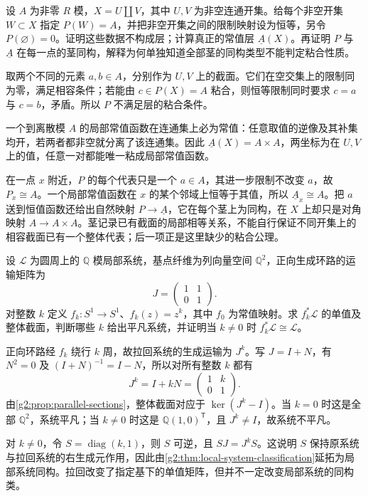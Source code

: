 \BookExercises

\begin{exercise}\label{g2:ex:constant-presheaf-gluing}
	设 \(A\) 为非零 \(R\) 模，\(X=U\amalg V\)，其中 \(U,V\) 为非空连通开集。给每个非空开集 \(W\subset X\) 指定 \(P(W)=A\)，并把非空开集之间的限制映射设为恒等，另令 \(P(\varnothing)=0\)。证明这些数据不构成层；计算真正的常值层 \(\underline A(X)\)。再证明 \(P\) 与 \(\underline A\) 在每一点的茎同构，解释为何单独知道全部茎的同构类型不能判定粘合性质。
\end{exercise}
\begin{solution}
	取两个不同的元素 \(a,b\in A\)，分别作为 \(U,V\) 上的截面。它们在空交集上的限制同为零，满足相容条件；若能由 \(c\in P(X)=A\) 粘合，则恒等限制同时要求 \(c=a\) 与 \(c=b\)，矛盾。所以 \(P\) 不满足层的粘合条件。

	一个到离散模 \(A\) 的局部常值函数在连通集上必为常值：任意取值的逆像及其补集均开，若两者都非空就分离了该连通集。因此 \(\underline A(X)=A\times A\)，两坐标为在 \(U,V\) 上的值，任意一对都能唯一粘成局部常值函数。

	在一点 \(x\) 附近，\(P\) 的每个代表只是一个 \(a\in A\)，其进一步限制不改变 \(a\)，故 \(P_x\cong A\)。一个局部常值函数在 \(x\) 的某个邻域上恒等于其值，所以 \(\underline A_x\cong A\)。把 \(a\) 送到恒值函数还给出自然映射 \(P\to\underline A\)，它在每个茎上为同构，在 \(X\) 上却只是对角映射 \(A\to A\times A\)。茎记录已有截面的局部相等关系，不能自行保证不同开集上的相容截面已有一个整体代表；后一项正是这里缺少的粘合公理。
\end{solution}

\begin{exercise}\label{g2:ex:unipotent-circle-system}
	设 \(\mathcal L\) 为圆周上的 \(\mathbb Q\) 模局部系统，基点纤维为列向量空间 \(\mathbb Q^2\)，正向生成环路的运输矩阵为
	\[
		J=\begin{pmatrix}1&1\\0&1\end{pmatrix}.
	\]
	对整数 \(k\) 定义 \(f_k:S^1\to S^1\)、\(f_k(z)=z^k\)，其中 \(f_0\) 为常值映射。求 \(f_k^*\mathcal L\) 的单值及整体截面，判断哪些 \(k\) 给出平凡系统，并证明当 \(k\ne0\) 时 \(f_k^*\mathcal L\cong\mathcal L\)。
\end{exercise}
\begin{solution}
	正向环路经 \(f_k\) 绕行 \(k\) 周，故拉回系统的生成运输为 \(J^k\)。写 \(J=I+N\)，有 \(N^2=0\) 及 \((I+N)^{-1}=I-N\)，所以对所有整数 \(k\) 都有
	\[
		J^k=I+kN=\begin{pmatrix}1&k\\0&1\end{pmatrix}.
	\]
	由\cref{g2:prop:parallel-sections}，整体截面对应于 \(\ker(J^k-I)\)。当 \(k=0\) 时这是全部 \(\mathbb Q^2\)，系统平凡；当 \(k\ne0\) 时这是 \(\mathbb Q(1,0)^{\mathsf T}\)，且 \(J^k\ne I\)，故系统不平凡。

	对 \(k\ne0\)，令 \(S=\operatorname{diag}(k,1)\)，则 \(S\) 可逆，且 \(SJ=J^kS\)。这说明 \(S\) 保持原系统与拉回系统的右生成元作用，因此由\cref{g2:thm:local-system-classification}延拓为局部系统同构。拉回改变了指定基下的单值矩阵，但并不一定改变局部系统的同构类。
\end{solution}

